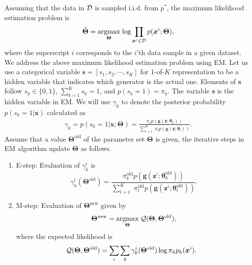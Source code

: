 Assuming that the data in $\mathcal{D}$ is sampled i.i.d. from $p^{\ast}$, the maximum likelihood estimation problem is
\begin{equation}\label{eq:max-genmm}
  \hat{\bm{\Theta}} = \underset{\bm{\Theta}}{\operatorname{argmax}}\;{\log{\prod_{\bm{x}^{i} \in \mathcal{D}} p(\bm{x}^{i};\bm{\Theta})}},
\end{equation}
where the superscript $i$ corresponds to the $i$'th data sample in a given dataset.
We address the above maximum likelihood estimation problem using EM. 
Let us use a categorical variable $\bm{s} = [s_1, s_2, \cdots, s_K]$
for $1$-of-$K$ representation to be a hidden variable that indicates which generator is the actual one. Elements of $\bm{s}$ follow $s_k \in \{0,1\}$, $\sum_{k=1}^K s_k =1$, and $p(s_k=1)=\pi_k$. The variable $\bm{s}$ is the hidden variable in EM. We will use $\gamma_k$ to denote the posterior probability $p(s_k =1|\bm{x})$ calculated as
\begin{align}\label{eq-genmm-gamma-org}
  \gamma_k = p(s_k =1|\bm{x};\bm{\Theta}) 
  = \frac{\pi_k p(\bm{g}(\bm{z};\bm{\theta}_k))}{\sum_{l=1}^K\; \pi_l p(\bm{g}(\bm{z};\bm{\theta}_l))}.
\end{align}
Assume that a value $\bm{\Theta}^{\mathrm{old}}$ of the parameter set $\bm{\Theta}$ is given, the iterative steps in EM algorithm update $\bm{\Theta}$ as follows.
\begin{enumerate}
\item E-step: Evaluation of $\gamma_{k}^{i}$ is 
  \begin{equation}\label{eq-genmm-e-step}
    \gamma_{k}^{i}(\bm{\Theta}^{\mathrm{old}}) = \frac{\pi_k^\mathrm{{old}} p(\bm{g}(\bm{z}^{i};\bm{\theta}_k^{\mathrm{old}}))}{\sum_{l=1}^K\; \pi_l^\mathrm{{old}} p(\bm{g}(\bm{z}^{i};\bm{\theta}_l^{\mathrm{old}}))}.   
  \end{equation}
\item M-step: Evaluation of $\bm{\Theta}^{\mathrm{new}}$ given by
  \begin{equation}\label{eq-genmm-opt}
    \bm{\Theta}^{\mathrm{new}} =   \underset{\bm{\Theta}}{\operatorname{argmax}}\;{\mathcal{Q} (\bm{\Theta},\bm{\Theta}^{\mathrm{old}})}, 
  \end{equation}
  where the expected likelihood is
  \begin{equation}
    \hspace{-8pt}\mathcal{Q} (\bm{\Theta},\bm{\Theta}^{\mathrm{old}}) = \sum_{i}\sum_{k} \gamma_{k}^{i}(\bm{\Theta}^{\mathrm{old}}) \log \pi_k p_k(\bm{x}^{i}).
  \end{equation}
\end{enumerate}

